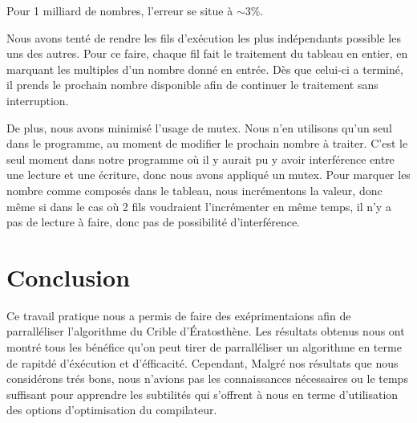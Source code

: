 \documentclass{report}
\begin{document}
	Pour 1 milliard de nombres, l'erreur se situe à $\sim 3\%$.
	
	\bigskip
	Nous avons tenté de rendre les fils d'exécution les plus indépendants 
	possible les uns des autres. Pour ce faire, chaque fil fait le traitement 
	du tableau en entier, en marquant les multiples d'un nombre donné en entrée. 
	Dès que celui-ci a terminé, il prends le prochain nombre disponible afin de 
	continuer le traitement sans interruption.
	
	\smallskip
	De plus, nous avons minimisé l'usage de mutex. Nous n'en utilisons qu'un seul 
	dans le programme, au moment de modifier le prochain nombre à traiter. C'est le 
	seul moment dans notre programme où il y aurait pu y avoir interférence entre 
	une lecture et une écriture, donc nous avons appliqué un mutex. Pour marquer les 
	nombre comme composés dans le tableau, nous incrémentons la valeur, donc même 
	si dans le cas où 2 fils voudraient l'incrémenter en même temps, il n'y a pas 
	de lecture à faire, donc pas de possibilité d'interférence.
	
\chapter{Conclusion}
Ce travail pratique nous a permis de faire des exéprimentaions afin de parralléliser l'algorithme du Crible d'Ératosthène.
Les résultats obtenus nous ont montré tous les bénéfice qu'on peut tirer de parralléliser un algorithme en terme de rapitdé
d'éxécution et d'éfficacité.
Cependant, Malgré nos résultats que nous considérons trés bons, nous n'avions pas les connaissances nécessaires ou le temps suffisant
pour apprendre les subtilités qui s'offrent à nous en terme d'utilisation des options d'optimisation du compilateur.
\end{document}

